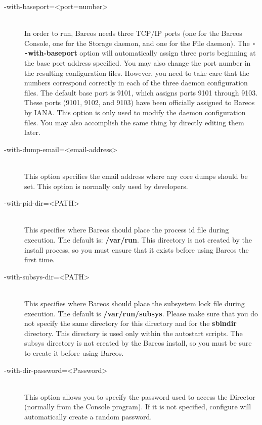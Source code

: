 \begin{description}
\item [ {-}{\-}with-baseport={\textless}port=number{\textgreater}] \hfill \\
In order to run,  Bareos needs three TCP/IP ports (one for the Bareos
Console, one for the Storage daemon, and one for the File daemon).  The {\bf
\verb:--:with-baseport} option will automatically assign three  ports beginning at
the base port address specified. You may  also change the port number in the
resulting configuration  files. However, you need to take care that the
numbers  correspond correctly in each of the three daemon configuration
files. The default base port is 9101, which assigns ports 9101  through 9103.
These ports (9101, 9102, and 9103) have been  officially assigned to Bareos by
IANA.  This option is only used  to modify the daemon configuration files. You
may also accomplish  the same thing by directly editing them later.

\item [ {-}{\-}with-dump-email={\textless}email-address{\textgreater}] \hfill \\
This option specifies  the email address where any core dumps should be set.
This option  is normally only used by developers.

\item [ {-}{\-}with-pid-dir={\textless}PATH{\textgreater}] \hfill \\
This specifies where Bareos should place the process id  file during
execution. The default is: {\bf /var/run}.  This directory is not created by
the install process, so  you must ensure that it exists before using Bareos
the  first time.

\item [ {-}{\-}with-subsys-dir={\textless}PATH{\textgreater}] \hfill \\
This specifies where Bareos should place the subsystem lock  file during
execution. The default is {\bf /var/run/subsys}.  Please make sure that you do
not specify the same directory  for this directory and for the {\bf sbindir}
directory.  This directory is used only within the autostart scripts.  The
subsys directory is not created by the Bareos install,  so you must be sure to
create it before using Bareos.

\item [ {-}{\-}with-dir-password={\textless}Password{\textgreater}] \hfill \\
This option allows you to specify the password used to  access the Director
(normally from the Console program).  If it is not specified, configure will
automatically create a random  password.


\end{description}
